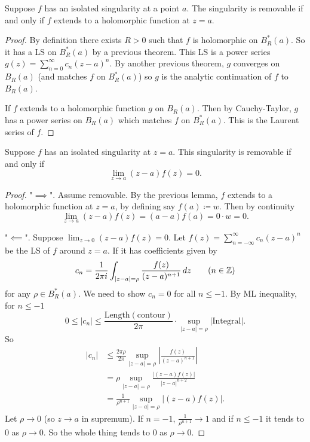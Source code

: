 \documentclass[10pt, a4paper]{article}
\begin{document}
\begin{lemma}
    Suppose $f$ has an isolated singularity at a point $a$.
    The singularity is removable if and only if $f$ extends to a holomorphic function at $z = a$.

    \begin{proof}
        By definition there exists $R > 0$ such that $f$ is holomorphic on $B_{R}^{*}(a)$.
        So it has a LS on $B_{R}^{*}(a)$ by a previous theorem.
        This LS is a power series $g(z) = \sum_{n = 0}^{\infty}c_n(z - a) ^ n$.
        By another previous theorem,
        $g$ converges on $B_R(a)$
        (and matches $f$ on $B_{R}^{*}(a)$)
        so $g$ is the analytic continuation of $f$ to $B_R(a)$.

        If $f$ extends to a holomorphic function $g$ on $B_R(a)$.
        Then by Cauchy-Taylor,
        $g$ has a power series on $B_R(a)$ which matches $f$ on $B_{R}^{*}(a)$.
        This is the Laurent series of $f$.
    \end{proof}
\end{lemma}

\begin{proposition}
    Suppose $f$ has an isolated singularity at $z = a$.
    This singularity is removable if and only if
    \[
    \lim_{z \to a}(z - a)f(z) = 0.
    \]

    \begin{proof}
        "$\implies$".
        Assume removable.
        By the previous lemma,
        $f$ extends to a holomorphic function at $z = a$,
        by defining say $f(a) \coloneqq w$.
        Then by continuity
        \[
        \lim_{z \to a}(z - a)f(z) = (a - a)f(a) = 0 \cdot w = 0.
        \]

        "$\impliedby$".
        Suppose $\lim_{z \to 0}(z - a)f(z) = 0$.
        Let $f(z) = \sum_{n = -\infty}^{\infty}c_n(z - a) ^ n$ be the LS of $f$ around $z = a$.
        If it has coefficients given by
        \[
        c_n = \frac{1}{2\pi i}\int_{|z - a| = \rho}\frac{f(z)}{(z - a) ^ {n + 1}}\,dz\qquad (n \in \mathbb{Z})
        \]
        for any $\rho \in B_{R}^{*}(a)$.
        We need to show $c_n = 0$ for all $n \leq -1$.
        By ML inequality,
        for $n \leq -1$
        \[
        0 \leq |c_n| \leq \frac{\text{Length}(\text{contour})}{2\pi}\cdot\sup_{|z - a| = \rho}\left|\text{Integral}\right|.
        \]
        So
        \begin{align*}
            |c_n| &\leq \frac{2\pi \rho}{2\pi}\sup_{|z - a| = \rho}\left|\frac{f(z)}{(z - a) ^ {n + 1}}\right| \\
            &= \rho\sup_{|z - a| = \rho}\frac{|(z - a)f(z)|}{|z - a| ^ {n + 2}} \\
            &= \frac{1}{\rho ^ {n + 1}}\sup_{|z - a| = \rho}|(z - a)f(z)|.
        \end{align*}
        Let $\rho \to 0$
        (so $z \to a$ in supremum).
        If $n = -1$,
        $\frac{1}{\rho ^ {n + 1}} \to 1$ and if $n \leq -1$ it tends to $0$ as $\rho \to 0$.
        So the whole thing tends to $0$ as $\rho \to 0$.
    \end{proof}
\end{proposition}
\end{document}

